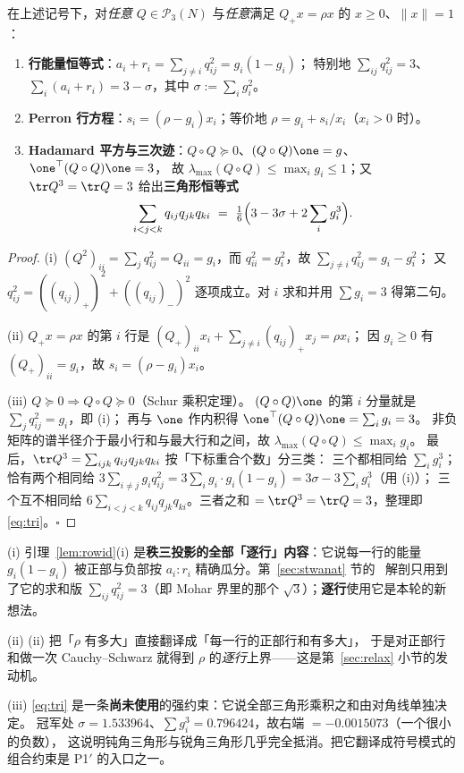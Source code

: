 \begin{lemma}[三条新恒等式，已证]\label{lem:rowid}
在上述记号下，对\emph{任意} $Q\in\mathcal P_3(N)$ 与\emph{任意}满足 $Q_+x=\rho x$ 的 $x\ge0$、$\|x\|=1$：
\begin{enumerate}[label=(\roman*),leftmargin=2.2em]
\item \textbf{行能量恒等式}：$\displaystyle a_i+r_i=\sum_{j\ne i}q_{ij}^2=g_i(1-g_i)$；
特别地 $\sum_{ij}q_{ij}^2=3$、$\sum_i(a_i+r_i)=3-\sigma$，其中 $\sigma:=\sum_ig_i^2$。
\item \textbf{Perron 行方程}：$s_i=(\rho-g_i)x_i$；等价地 $\rho=g_i+s_i/x_i$（$x_i>0$ 时）。
\item \textbf{Hadamard 平方与三次迹}：$Q\circ Q\succeq0$、$(Q\circ Q)\one=g$、$\one^\top(Q\circ Q)\one=3$，
故 $\lambda_{\max}(Q\circ Q)\le\max_ig_i\le1$；又 $\tr Q^3=\tr Q=3$ 给出\textbf{三角形恒等式}
\begin{equation}\label{eq:tri}
\sum_{i<j<k}q_{ij}q_{jk}q_{ki}\ =\ \tfrac16\Bigl(3-3\sigma+2\sum_ig_i^3\Bigr).
\end{equation}
\end{enumerate}
\end{lemma}

\begin{proof}
(i) $(Q^2)_{ii}=\sum_jq_{ij}^2=Q_{ii}=g_i$，而 $q_{ii}^2=g_i^2$，故 $\sum_{j\ne i}q_{ij}^2=g_i-g_i^2$；
又 $q_{ij}^2=((q_{ij})_+)^2+((q_{ij})_-)^2$ 逐项成立。对 $i$ 求和并用 $\sum g_i=3$ 得第二句。

(ii) $Q_+x=\rho x$ 的第 $i$ 行是 $(Q_+)_{ii}x_i+\sum_{j\ne i}(q_{ij})_+x_j=\rho x_i$；
因 $g_i\ge0$ 有 $(Q_+)_{ii}=g_i$，故 $s_i=(\rho-g_i)x_i$。

(iii) $Q\succeq0\Rightarrow Q\circ Q\succeq0$（Schur 乘积定理）。
$(Q\circ Q)\one$ 的第 $i$ 分量就是 $\sum_jq_{ij}^2=g_i$，即 (i)；
再与 $\one$ 作内积得 $\one^\top(Q\circ Q)\one=\sum_ig_i=3$。
非负矩阵的谱半径介于最小行和与最大行和之间，故 $\lambda_{\max}(Q\circ Q)\le\max_ig_i$。
最后，$\tr Q^3=\sum_{ijk}q_{ij}q_{jk}q_{ki}$ 按「下标重合个数」分三类：
三个都相同给 $\sum_ig_i^3$；恰有两个相同给 $3\sum_{i\ne j}g_iq_{ij}^2=3\sum_ig_i\cdot g_i(1-g_i)=3\sigma-3\sum_ig_i^3$（用 (i)）；
三个互不相同给 $6\sum_{i<j<k}q_{ij}q_{jk}q_{ki}$。三者之和 $=\tr Q^3=\tr Q=3$，整理即 \eqref{eq:tri}。$\square$
\end{proof}

\begin{remark}\label{rmk:rowidread}
(i) 引理~\ref{lem:rowid}(i) 是\textbf{秩三投影的全部「逐行」内容}：它说每一行的能量 $g_i(1-g_i)$
被正部与负部按 $a_i:r_i$ 精确瓜分。第~\ref{sec:stwanat} 节的 \STW\ 解剖只用到了它的求和版
$\sum_{ij}q_{ij}^2=3$（即 Mohar 界里的那个 $\sqrt3$）；\textbf{逐行}使用它是本轮的新想法。

(ii) (ii) 把「$\rho$ 有多大」直接翻译成「每一行的正部行和有多大」，
于是对正部行和做一次 Cauchy--Schwarz 就得到 $\rho$ 的\emph{逐行}上界——这是第~\ref{sec:relax} 小节的发动机。

(iii) \eqref{eq:tri} 是一条\textbf{尚未使用}的强约束：它说全部三角形乘积之和由对角线单独决定。
冠军处 $\sigma=1.533964$、$\sum g_i^3=0.796424$，故右端 $=-0.0015073$（一个很小的负数），
这说明钝角三角形与锐角三角形几乎完全抵消。把它翻译成符号模式的组合约束是 P1$'$ 的入口之一。
\end{remark}
